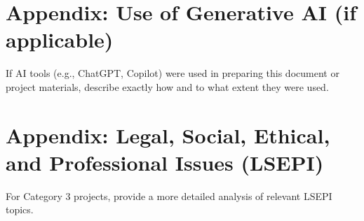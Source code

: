 \documentclass[12pt,a4paper]{article}
\begin{document}
\newpage
\section{Appendix: Use of Generative AI (if applicable)}
If AI tools (e.g., ChatGPT, Copilot) were used in preparing this document or project materials, describe exactly how and to what extent they were used.

\newpage
\section{Appendix: Legal, Social, Ethical, and Professional Issues (LSEPI)}
For Category 3 projects, provide a more detailed analysis of relevant LSEPI topics.
\end{document}
